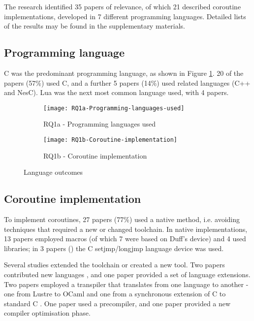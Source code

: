 The research identified 35 papers of relevance, of which 21 described coroutine implementations, developed in 7 different programming languages. Detailed lists of the results may be found in the supplementary materials.

\subsection{Programming language}

C was the predominant programming language, as shown in Figure \ref{fig:rq1a}. 20 of the papers (57\%) used C, and a further 5 papers (14\%) used related languages (C++ and NesC). Lua was the next most common language used, with 4 papers.

\begin{figure}[h]
	\centering
	\begin{subfigure}[h]{0.48\textwidth}
		\centering
		\texttt{[image: RQ1a-Programming-languages-used]}
		\caption{RQ1a - Programming languages used}
		\label{fig:rq1a}
	\end{subfigure}
	\begin{subfigure}[h]{0.46\textwidth}
		\centering
		\texttt{[image: RQ1b-Coroutine-implementation]}
		\caption{RQ1b - Coroutine implementation}
		\label{fig:rq1b}
	\end{subfigure}
	\caption{Language outcomes}
\end{figure}

\subsection{Coroutine implementation}

To implement coroutines, 27 papers (77\%) used a native method, i.e. avoiding techniques that required a new or changed toolchain. In native implementations, 13 papers employed macros (of which 7 were based on Duff’s device) and 4 used libraries; in 3 papers (\cite{Yu2008, Cohen2007b, Kalebe2017}) the C setjmp/longjmp language device was used.

Several studies extended the toolchain or created a new tool. Two papers contributed new languages \cite{Jahier2016, Evers2007}, and one paper \cite{Niebert2014} provided a set of language extensions. Two papers employed a transpiler that translates from one language to another - one from Lustre to OCaml \cite{Jahier2016} and one from a synchronous extension of C to standard C \cite{Karpin2007}. One paper \cite{Fritzsche2010} used a precompiler, and one paper \cite{Jaaskelainen2008} provided a new compiler optimisation phase.

